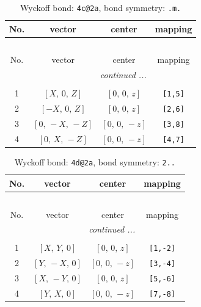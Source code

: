 \documentclass[fleqn,8pt]{jsarticle}
\begin{document}
\renewcommand{\arraystretch}{1.2}
\begin{longtable}{cccc}
\caption{Wyckoff bond: {\tt 4c@2a}, bond symmetry: {\tt .m.}}
 \\
 \hline \hline
No. & vector & center & mapping \\ \hline \endfirsthead

\multicolumn{3}{l}{\tablename\ \thetable{}} \\
 \hline \hline
No. & vector & center & mapping \\ \hline \endhead

 \hline \hline
\multicolumn{3}{r}{\footnotesize\it continued ...} \\ \endfoot

 \hline \hline
\multicolumn{3}{r}{} \\ \endlastfoot

1 & $\left[ X,\, 0,\, Z \right]$ & $\left[ 0,\, 0,\, z \right]$ & {\tt [1,5]} \\ \hline
2 & $\left[ - X,\, 0,\, Z \right]$ & $\left[ 0,\, 0,\, z \right]$ & {\tt [2,6]} \\ \hline
3 & $\left[ 0,\, - X,\, - Z \right]$ & $\left[ 0,\, 0,\, - z \right]$ & {\tt [3,8]} \\ \hline
4 & $\left[ 0,\, X,\, - Z \right]$ & $\left[ 0,\, 0,\, - z \right]$ & {\tt [4,7]} \\
\end{longtable}
\renewcommand{\arraystretch}{1.2}
\begin{longtable}{cccc}
\caption{Wyckoff bond: {\tt 4d@2a}, bond symmetry: {\tt 2..}}
 \\
 \hline \hline
No. & vector & center & mapping \\ \hline \endfirsthead

\multicolumn{3}{l}{\tablename\ \thetable{}} \\
 \hline \hline
No. & vector & center & mapping \\ \hline \endhead

 \hline \hline
\multicolumn{3}{r}{\footnotesize\it continued ...} \\ \endfoot

 \hline \hline
\multicolumn{3}{r}{} \\ \endlastfoot

1 & $\left[ X,\, Y,\, 0 \right]$ & $\left[ 0,\, 0,\, z \right]$ & {\tt [1,-2]} \\ \hline
2 & $\left[ Y,\, - X,\, 0 \right]$ & $\left[ 0,\, 0,\, - z \right]$ & {\tt [3,-4]} \\ \hline
3 & $\left[ X,\, - Y,\, 0 \right]$ & $\left[ 0,\, 0,\, z \right]$ & {\tt [5,-6]} \\ \hline
4 & $\left[ Y,\, X,\, 0 \right]$ & $\left[ 0,\, 0,\, - z \right]$ & {\tt [7,-8]} \\
\end{longtable}
\end{document}
